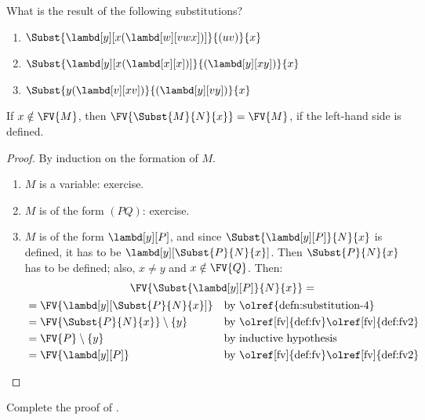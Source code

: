 \documentclass[../../../include/open-logic-section]{subfiles}
\begin{document}
\begin{prob}
  What is the result of the following substitutions?
  \begin{enumerate}
  \item $\Subst{\lambd[y][x(\lambd[w][vwx])]}{(uv)}{x}$
  \item $\Subst{\lambd[y][x(\lambd[x][x])]}{(\lambd[y][xy])}{x}$
  \item $\Subst{y(\lambd[v][xv])}{(\lambd[y][vy])}{x}$
  \end{enumerate}
\end{prob}

\begin{thm} 
  If $x \notin \FV{M}$, then $\FV{\Subst{M}{N}{x}} = \FV{M}$, if
  the left-hand side is defined.
\end{thm}

\begin{proof}
  By induction on the formation of $M$.
  \begin{enumerate}
  \item $M$ is a variable: exercise.
  \item $M$ is of the form $(PQ)$: exercise.
  \item $M$ is of the form $\lambd[y][P]$, and since
    $\Subst{\lambd[y][P]}{N}{x}$ is defined, it has to be
    $\lambd[y][\Subst{P}{N}{x}]$. Then $\Subst{P}{N}{x}$ has to be
    defined; also, $x \neq y$ and $x \notin \FV{Q}$. Then:
    \begin{multline*}
      \FV{\Subst{\lambd[y][P]}{N}{x}} = \\
    \begin{aligned}
      & = \FV{\lambd[y][\Subst{P}{N}{x}]} &&
      \text{by \olref{defn:substitution-4}}\\
      & = \FV{\Subst{P}{N}{x}} \setminus \{y\} &&
      \text{by \olref[fv]{def:fv}\olref[fv]{def:fv2}}\\
      & = \FV{P} \setminus \{y\} && \text{by inductive hypothesis} \\
      & = \FV{\lambd[y][P]} && \text{by \olref[fv]{def:fv}\olref[fv]{def:fv2}}
    \end{aligned}
    \end{multline*}
  \end{enumerate}
\end{proof}

\begin{prob}
  Complete the proof of .
\end{prob}
\end{document}
